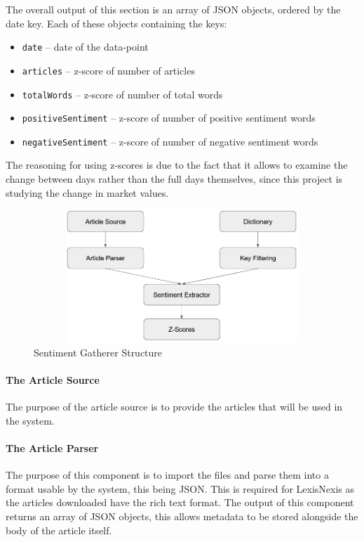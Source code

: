 The overall output of this section is an array of JSON objects, ordered by the date key. Each of these objects containing the keys:
\begin{itemize}
    \item \texttt{date} -- date of the data-point
    \item \texttt{articles} -- z-score of number of articles
    \item \texttt{totalWords} -- z-score of number of total words
    \item \texttt{positiveSentiment} -- z-score of number of positive sentiment words
    \item \texttt{negativeSentiment} -- z-score of number of negative sentiment words
\end{itemize}
The reasoning for using z-scores is due to the fact that it allows to examine the change between days rather than the full days themselves, since this project is studying the change in market values.

\begin{figure}[h]
    \centering
    \includegraphics[width=15cm,height=5cm,keepaspectratio]{design/SentimentGathererStructure.png}
    \caption{Sentiment Gatherer Structure}
    \label{fig:sentimentgathererstructure}
\end{figure}

\paragraph{The Article Source}

The purpose of the article source is to provide the articles that will be used in the system.

\paragraph{The Article Parser}

The purpose of this component is to import the files and parse them into a format usable by the system, this being JSON. This is required for LexisNexis as the articles downloaded have the rich text format. The output of this component returns an array of JSON objects, this allows metadata to be stored alongside the body of the article itself.

